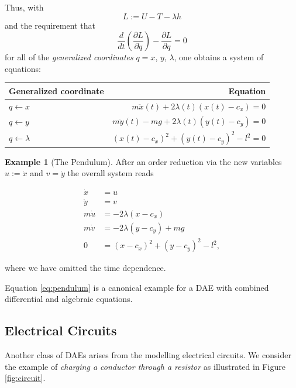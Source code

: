 \documentclass[]{book}
\theoremstyle{definition}
\theoremstyle{definition}
\newtheorem{example}{Example}[chapter]
\theoremstyle{definition}
\theoremstyle{definition}
\theoremstyle{remark}
\begin{document}
Thus, with \[L:=U-T- \lambda h\] and the requirement that
\[
\frac{d}{dt}(\frac{\partial L}{\partial \dot q}) - \frac{\partial L}{\partial q} = 0
\]
for all of the \emph{generalized coordinates} \(q=x\), \(y\), \(\lambda\),
one obtains a system of equations:

\begin{longtable}[]{@{}lr@{}}
\toprule
Generalized coordinate & Equation\tabularnewline
\midrule
\endhead
\(q \leftarrow x\) & \(m\ddot x(t) + 2 \lambda(t) (x(t) - c_x) = 0\)\tabularnewline
\(q \leftarrow y\) & \(m\ddot y(t) - mg + 2 \lambda(t) (y(t) - c_y) = 0\)\tabularnewline
\(q \leftarrow \lambda\) & \((x(t) - c_x)^2 + (y(t) - c_y)^2 - l^2 =0\)\tabularnewline
\bottomrule
\end{longtable}

\begin{example}[The Pendulum]
\protect\hypertarget{exm:the-pendulum}{}{\label{exm:the-pendulum} {} }
After an order reduction via the new variables \(u:=\dot x\) and \(v=\dot y\) the overall system reads

\begin{equation}
\begin{split}
\dot x &= u \\
\dot y &= v \\
m \dot u &= - 2 \lambda (x - c_x) \\ 
m \dot v &= - 2 \lambda (y - c_y) + mg \\
0&=(x - c_x)^2 + (y - c_y)^2 - l^2, 
\end{split}
\label{eq:pendulum}
\end{equation}

where we have omitted the time dependence.
\end{example}

Equation \eqref{eq:pendulum} is a canonical example for a DAE with combined differential and algebraic equations.

\hypertarget{electrical-circuits}{%
\subsection*{Electrical Circuits}\label{electrical-circuits}}

Another class of DAEs arises from the modelling electrical circuits. We consider the example of \emph{charging a conductor through a resistor} as illustrated in Figure \ref{fig:circuit}.
\end{document}
